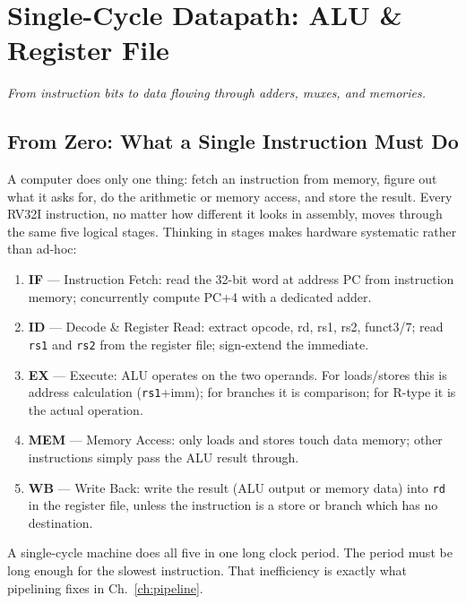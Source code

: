 \chapter{Single-Cycle Datapath: ALU \& Register File}\label{ch:datapath}
\begin{center}\small\textit{From instruction bits to data flowing through adders, muxes, and memories.}\end{center}

\section{From Zero: What a Single Instruction Must Do}
A computer does only one thing: fetch an instruction from memory, figure out what it asks for, do the arithmetic or memory access, and store the result. Every RV32I instruction, no matter how different it looks in assembly, moves through the same five logical stages. Thinking in stages makes hardware systematic rather than ad-hoc:
\begin{enumerate}
\item \textbf{IF} --- Instruction Fetch: read the 32-bit word at address PC from instruction memory; concurrently compute PC+4 with a dedicated adder.
\item \textbf{ID} --- Decode \& Register Read: extract opcode, rd, rs1, rs2, funct3/7; read \texttt{rs1} and \texttt{rs2} from the register file; sign-extend the immediate.
\item \textbf{EX} --- Execute: ALU operates on the two operands. For loads/stores this is address calculation (\texttt{rs1}+imm); for branches it is comparison; for R-type it is the actual operation.
\item \textbf{MEM} --- Memory Access: only loads and stores touch data memory; other instructions simply pass the ALU result through.
\item \textbf{WB} --- Write Back: write the result (ALU output or memory data) into \texttt{rd} in the register file, unless the instruction is a store or branch which has no destination.
\end{enumerate}
A single-cycle machine does all five in one long clock period. The period must be long enough for the slowest instruction. That inefficiency is exactly what pipelining fixes in Ch.~\ref{ch:pipeline}.


